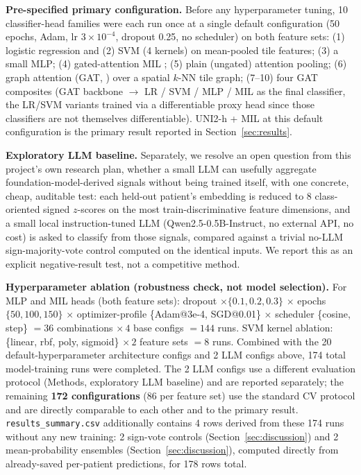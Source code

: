 \documentclass{article}
\begin{document}
\textbf{Pre-specified primary configuration.} Before any hyperparameter tuning, 10 classifier-head families were each run once at a single default configuration (50 epochs, Adam, lr $3\times10^{-4}$, dropout 0.25, no scheduler) on both feature sets: (1) logistic regression and (2) SVM (4 kernels) on mean-pooled tile features; (3) a small MLP; (4) gated-attention MIL \citep{ilse2018attention}; (5) plain (ungated) attention pooling; (6) graph attention (GAT, \citealt{velickovic2018graph}) over a spatial $k$-NN tile graph; (7--10) four GAT composites (GAT backbone $\to$ LR / SVM / MLP / MIL as the final classifier, the LR/SVM variants trained via a differentiable proxy head since those classifiers are not themselves differentiable). UNI2-h + MIL at this default configuration is the primary result reported in Section~\ref{sec:results}.

\textbf{Exploratory LLM baseline.} Separately, we resolve an open question from this project's own research plan, whether a small LLM can usefully aggregate foundation-model-derived signals without being trained itself, with one concrete, cheap, auditable test: each held-out patient's embedding is reduced to 8 class-oriented signed $z$-scores on the most train-discriminative feature dimensions, and a small local instruction-tuned LLM (Qwen2.5-0.5B-Instruct, no external API, no cost) is asked to classify from those signals, compared against a trivial no-LLM sign-majority-vote control computed on the identical inputs. We report this as an explicit negative-result test, not a competitive method.

\textbf{Hyperparameter ablation (robustness check, not model selection).} For MLP and MIL heads (both feature sets): dropout $\times\{0.1,0.2,0.3\}$ $\times$ epochs $\{50,100,150\}$ $\times$ optimizer-profile \{Adam@3e-4, SGD@0.01\} $\times$ scheduler \{cosine, step\} $=36$ combinations $\times\,4$ base configs $=144$ runs. SVM kernel ablation: \{linear, rbf, poly, sigmoid\} $\times\,2$ feature sets $=8$ runs. Combined with the 20 default-hyperparameter architecture configs and 2 LLM configs above, 174 total model-training runs were completed. The 2 LLM configs use a different evaluation protocol (Methods, exploratory LLM baseline) and are reported separately; the remaining \textbf{172 configurations} (86 per feature set) use the standard CV protocol and are directly comparable to each other and to the primary result. \texttt{results\_summary.csv} additionally contains 4 rows derived from these 174 runs without any new training: 2 sign-vote controls (Section~\ref{sec:discussion}) and 2 mean-probability ensembles (Section~\ref{sec:discussion}), computed directly from already-saved per-patient predictions, for 178 rows total.
\end{document}
